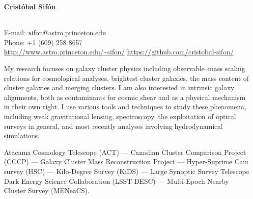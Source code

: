 \documentclass[11pt]{article}
\begin{document}
\begin{minipage}[b]{0.46\linewidth}
\flushleft
\hspace{-0.7cm}
{\bf\huge Crist\'obal Sif\'on}\\\vspace{0.2cm}
\\
\end{minipage}
\begin{minipage}[b]{0.49\linewidth}
\flushright
{\large E-mail: {\texttt sifon@astro.princeton.edu}\\
        Phone: +1 (609) 258 8657\\
        \url{http://www.astro.princeton.edu/~sifon/}
        \url{https://github.com/cristobal-sifon/}}
\end{minipage}
\vspace{0.4cm}
\hline




My research focuses on galaxy cluster physics including observable--mass scaling relations for cosmological analyses, brightest cluster galaxies, the mass content of cluster galaxies and merging clusters. I am also interested in intrinsic galaxy alignments, both as contaminants for cosmic shear and as a physical mechanism in their own right. I use various tools and techniques to study these phenomena, including weak gravitational lensing, spectroscopy, the exploitation of optical surveys in general, and most recently analyses involving hydrodynamical simulations.

\vspace{0.5cm}
{
 Atacama Cosmology Telescope (ACT) ---
 Canadian Cluster Comparison Project (CCCP) ---
 Galaxy Cluster Mass Reconstruction Project ---
 Hyper-Suprime Cam survey (HSC) ---
 Kilo-Degree Survey (KiDS) ---
 Large Synoptic Survey Telescope Dark Energy Science Collaboration (LSST-DESC) ---
 Multi-Epoch Nearby Cluster Survey (MENeaCS).
}
\end{document}
